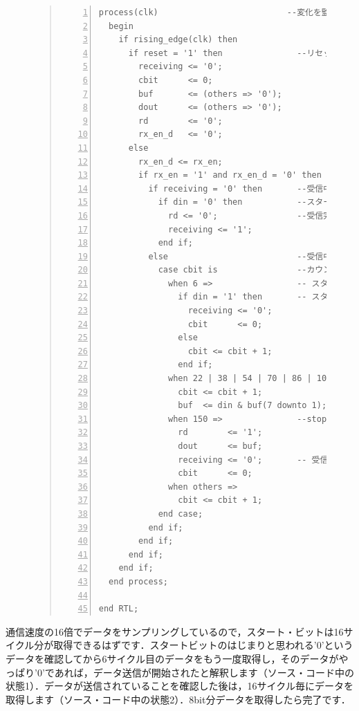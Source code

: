 \documentclass[a4paper,dvipdfmx]{jsarticle}
\begin{document}
\begin{figure}[H]
\begin{quote}
\begin{Verbatim}[frame=single, numbers=left, baselinestretch=0.8]
  process(clk)                          --変化を監視する信号を記述,この場合クロック
  begin
    if rising_edge(clk) then
      if reset = '1' then               --リセット時の動作, 初期値の設定
        receiving <= '0';
        cbit      <= 0;
        buf       <= (others => '0');
        dout      <= (others => '0');
        rd        <= '0';
        rx_en_d   <= '0';
      else
        rx_en_d <= rx_en;
        if rx_en = '1' and rx_en_d = '0' then   --受信用クロック立ち上がり時の動作
          if receiving = '0' then       --受信中でない場合
            if din = '0' then           --スタートビット0を受信したら
              rd <= '0';                --受信完了のフラグをさげる
              receiving <= '1';
            end if;
          else                          --受信中の場合
            case cbit is                --カウンタに合わせてデータをラッチ
              when 6 =>                 -- スタートビットのチェック
                if din = '1' then       -- スタートビットが中途半端．入力をキャンセル
                  receiving <= '0';
                  cbit      <= 0;
                else
                  cbit <= cbit + 1;
                end if;
              when 22 | 38 | 54 | 70 | 86 | 102 | 118 | 134 =>  --data
                cbit <= cbit + 1;
                buf  <= din & buf(7 downto 1);  -- 新しい入力と受信済みデータを連結
              when 150 =>               --stop
                rd        <= '1';
                dout      <= buf;
                receiving <= '0';       -- 受信完了
                cbit      <= 0;
              when others =>
                cbit <= cbit + 1;
            end case;
          end if;
        end if;
      end if;
    end if;
  end process;

end RTL;
\end{Verbatim}
\end{quote}
\end{figure}
通信速度の16倍でデータをサンプリングしているので，スタート・ビットは16サイクル分が取得できるはずです．スタートビットのはじまりと思われる'0'というデータを確認してから6サイクル目のデータをもう一度取得し，そのデータがやっぱり'0'であれば，データ送信が開始されたと解釈します（ソース・コード中の状態1）．データが送信されていることを確認した後は，16サイクル毎にデータを取得します（ソース・コード中の状態2）．8bit分データを取得したら完了です．
\end{document}
